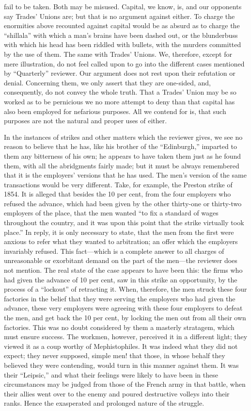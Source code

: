 fail to be taken. Both may be misused. Capital, we know, is, and our
opponents say Trades' Unions are; but that is no argument against
either. To charge the enormities above recounted against capital would
be as absurd as to charge the ``shillala'' with which a man's brains
have been dashed out, or the blunderbuss with which his head has been
riddled with bullets, with the murders committed by the use of them. The
same with Trades' Unions. We, therefore, except for mere illustration,
do not feel called upon to go into the different cases mentioned by
``Quarterly'' reviewer. Our argument does not rest upon their refutation
or denial. Concerning them, we only assert that they are one-sided, and,
consequently, do not convey the whole truth. That a Trades' Union may be
so worked as to be pernicious we no more attempt to deny than that
capital has also been employed for nefarious purposes. All we contend
for is, that such purposes are not the natural and proper uses of
either.

In the instances of strikes and other matters which the reviewer gives,
we see no reason to believe that he has, like his brother of the
``Edinburgh,'' imparted to them any bitterness of his own; he appears to
have taken them just as he found them, with all the abridgments fairly
made; but it must be always remembered that it is the employers'
versions that he has used. The men's version of the same transactions
would be very different. Take, for example, the Preston strike of 1854.
It is alleged that besides the 10 per cent, from the four employers who
refused the advance, which had been given by the other thirty-one or
thirty-two employers of the place, that the men wanted ``to fix a
standard of wages throughout the country, and it was upon this point
that the strike virtually took place.'' In reply, it is only necessary
to state, that the men from the first were anxious to refer what they
wanted to arbitration; an offer which the employers invariably refused.
This fact---which is a complete answer to all charges of unreasonable or
exorbitant demand on the part of the men---the reviewer does not
mention. The real state of the case appears to have been this: the firms
who had given the advance of 10 per cent, saw in this strike an
opportunity, by the process of a ``lockout'' of retracting it. When,
therefore, the men struck these four factories in the belief that they
were serving the employers who had given the advance, these very
employers were agreeing with these four employers to defeat the men, and
get back the 10 per cent, by locking the men out from all their own
factories. This was no doubt considered by them a masterly stratagem,
which must ensure success. The workmen, however, perceived it in a
different light; they viewed it as a coup worthy of Mephistophiles. It
was indeed what they did not expect; they never supposed, simple men!
that those, in whose behalf they believed they were contending, would
turn in this manner against them. It was their ``Leipsic,'' and what
their feelings were likely to have been in these circumstances may be
judged from those of the French army in that battle, when their allies
went over to the enemy and poured destructive volleys into their ranks.
Hence the exasperated and prolonged nature of the struggle.

